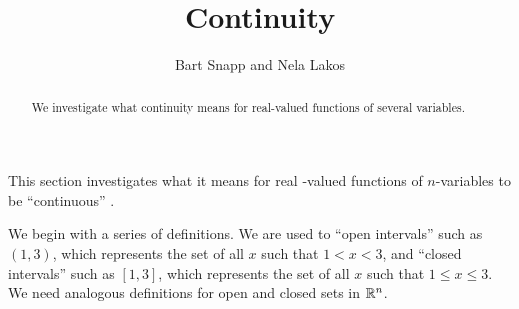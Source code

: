 \documentclass{ximera}
\author{Bart Snapp and Nela Lakos}
\title[Dig-In:]{Continuity}
\begin{document}
\begin{abstract}
We investigate what continuity means for real-valued functions of several variables.
\end{abstract}
\maketitle


This section investigates what it means for real -valued functions of $n$-variables to be ``continuous'' .

We begin with a series of definitions. We are
used to ``open intervals'' such as $(1,3)$, which represents the set
of all $x$ such that $1<x<3$, and ``closed intervals'' such as
$[1,3]$, which represents the set of all $x$ such that $1\leq x\leq
3$. We need analogous definitions for open and closed sets in $\mathbb R^n$.
\end{document}
